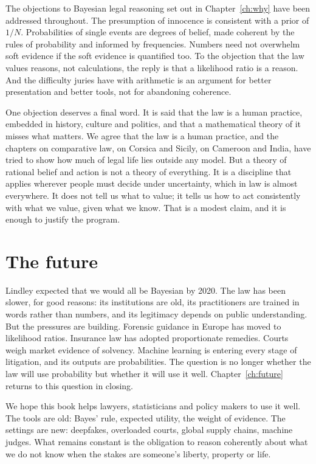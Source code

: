 The objections to Bayesian legal reasoning set out in Chapter~\ref{ch:why} have been addressed throughout. The presumption of innocence is consistent with a prior of $1/N$. Probabilities of single events are degrees of belief, made coherent by the rules of probability and informed by frequencies. Numbers need not overwhelm soft evidence if the soft evidence is quantified too. To the objection that the law values reasons, not calculations, the reply is that a likelihood ratio is a reason. And the difficulty juries have with arithmetic is an argument for better presentation and better tools, not for abandoning coherence.

One objection deserves a final word. It is said that the law is a human practice, embedded in history, culture and politics, and that a mathematical theory of it misses what matters. We agree that the law is a human practice, and the chapters on comparative law, on Corsica and Sicily, on Cameroon and India, have tried to show how much of legal life lies outside any model. But a theory of rational belief and action is not a theory of everything. It is a discipline that applies wherever people must decide under uncertainty, which in law is almost everywhere. It does not tell us what to value; it tells us how to act consistently with what we value, given what we know. That is a modest claim, and it is enough to justify the program.

\section{The future}

Lindley expected that we would all be Bayesian by 2020. The law has been slower, for good reasons: its institutions are old, its practitioners are trained in words rather than numbers, and its legitimacy depends on public understanding. But the pressures are building. Forensic guidance in Europe has moved to likelihood ratios. Insurance law has adopted proportionate remedies. Courts weigh market evidence of solvency. Machine learning is entering every stage of litigation, and its outputs are probabilities. The question is no longer whether the law will use probability but whether it will use it well. Chapter~\ref{ch:future} returns to this question in closing.

We hope this book helps lawyers, statisticians and policy makers to use it well. The tools are old: Bayes' rule, expected utility, the weight of evidence. The settings are new: deepfakes, overloaded courts, global supply chains, machine judges. What remains constant is the obligation to reason coherently about what we do not know when the stakes are someone's liberty, property or life.

